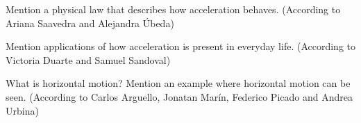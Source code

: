 \begin{question}
    Mention a physical law that describes how acceleration behaves.
    (According to Ariana Saavedra and Alejandra Úbeda)
\end{question}

\begin{question}
    Mention applications of how acceleration is present in everyday life.
    (According to Victoria Duarte and Samuel Sandoval)
\end{question}

\begin{question}
    What is horizontal motion?
    Mention an example where horizontal motion can be seen.
    (According to Carlos Arguello, Jonatan Marín, Federico Picado and Andrea Urbina)
\end{question}